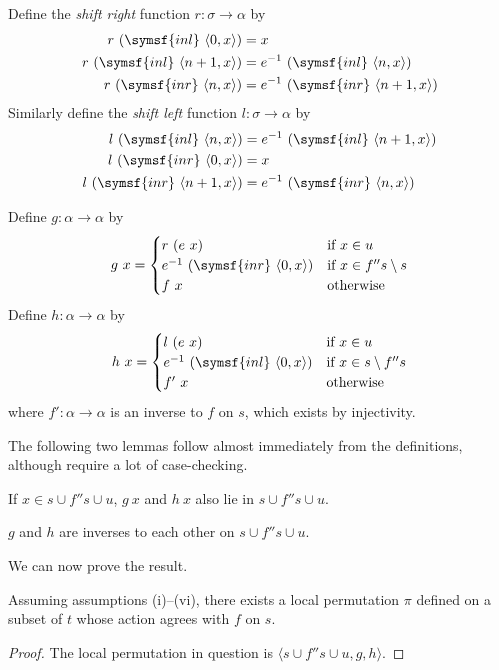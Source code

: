 \begin{definition}
    Define the \emph{shift right} function \( r : \sigma \to \alpha \) by
    \begin{align*}
        r\ (\symsf{inl}\ \langle 0, x \rangle) &= x \\
        r\ (\symsf{inl}\ \langle n + 1, x \rangle) &= e^{-1}\ (\symsf{inl}\ \langle n, x \rangle) \\
        r\ (\symsf{inr}\ \langle n, x \rangle) &= e^{-1}\ (\symsf{inr}\ \langle n + 1, x \rangle)
    \end{align*}
    Similarly define the \emph{shift left} function \( l : \sigma \to \alpha \) by
    \begin{align*}
        l\ (\symsf{inl}\ \langle n, x \rangle) &= e^{-1}\ (\symsf{inl}\ \langle n + 1, x \rangle) \\
        l\ (\symsf{inr}\ \langle 0, x \rangle) &= x \\
        l\ (\symsf{inr}\ \langle n + 1, x \rangle) &= e^{-1}\ (\symsf{inr}\ \langle n, x \rangle)
    \end{align*}
\end{definition}
\begin{definition}
    Define \( g : \alpha \to \alpha \) by
    \[ g\ x = \begin{cases}
        r\ (e\ x) & \text{if } x \in u \\
        e^{-1}\ (\symsf{inr}\ \langle 0, x \rangle) & \text{if } x \in f '' s \setminus s \\
        f\ x & \text{otherwise}
    \end{cases} \]
    Define \( h : \alpha \to \alpha \) by
    \[ h\ x = \begin{cases}
        l\ (e\ x) & \text{if } x \in u \\
        e^{-1}\ (\symsf{inl}\ \langle 0, x \rangle) & \text{if } x \in s \setminus f '' s \\
        f'\ x & \text{otherwise}
    \end{cases} \]
    where \( f' : \alpha \to \alpha \) is an inverse to \( f \) on \( s \), which exists by injectivity.
\end{definition}
The following two lemmas follow almost immediately from the definitions, although require a lot of case-checking.
\begin{lemma}
    If \( x \in s \cup f '' s \cup u \), \( g\ x \) and \( h\ x \) also lie in \( s \cup f '' s \cup u \).
\end{lemma}
\begin{lemma}
    \( g \) and \( h \) are inverses to each other on \( s \cup f '' s \cup u \).
\end{lemma}
We can now prove the result.
\begin{lemma}
    Assuming assumptions (i)--(vi), there exists a local permutation \( \pi \) defined on a subset of \( t \) whose action agrees with \( f \) on \( s \).
\end{lemma}
\begin{proof}
    The local permutation in question is \( \langle s \cup f '' s \cup u, g, h \rangle \).
\end{proof}
